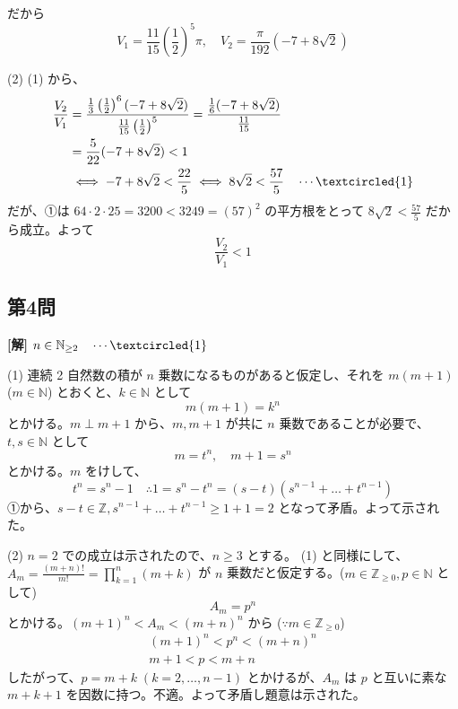 \documentclass[../main.tex]{subfiles}
\begin{document}
だから
\[
  V_1 = \frac{11}{15} \left(\frac{1}{2}\right)^5 \pi, \quad V_2 = \frac{\pi}{192} (-7 + 8\sqrt{2})
\]

\bigskip

\noindent
(2) (1) から、
\begin{align*}
  \frac{V_2}{V_1} &= \frac{\frac{1}{3} \left(\frac{1}{2}\right)^6 (-7 + 8\sqrt{2})}{\frac{11}{15} \left(\frac{1}{2}\right)^5} = \frac{\frac{1}{6}(-7 + 8\sqrt{2})}{\frac{11}{15}} \\
  &= \frac{5}{22} (-7 + 8\sqrt{2}) < 1 \\
  &\iff -7 + 8\sqrt{2} < \frac{22}{5} \iff 8\sqrt{2} < \frac{57}{5} \quad \cdots \textcircled{1}
\end{align*}
だが、①は $64 \cdot 2 \cdot 25 = 3200 < 3249 = (57)^2$ の平方根をとって
$8\sqrt{2} < \frac{57}{5}$ だから成立。よって
\[ \frac{V_2}{V_1} < 1 \]

\bigskip

\subsection*{第4問}

\noindent
\textbf{[解]} $n \in \mathbb{N}_{\ge 2} \quad \cdots \textcircled{1}$

\bigskip

\noindent
(1) 連続 2 自然数の積が $n$ 乗数になるものがあると仮定し、それを $m(m+1)$ ($m \in \mathbb{N}$) とおくと、$k \in \mathbb{N}$ として
\[ m(m+1) = k^n \]
とかける。$m \perp m+1$ から、$m, m+1$ が共に $n$ 乗数であることが必要で、
$t, s \in \mathbb{N}$ として
\[ m = t^n, \quad m+1 = s^n \]
とかける。$m$ をけして、
\[ t^n = s^n - 1 \quad \therefore 1 = s^n - t^n = (s-t)(s^{n-1} + \dots + t^{n-1}) \]
①から、$s-t \in \mathbb{Z}, s^{n-1} + \dots + t^{n-1} \ge 1+1 = 2$ となって矛盾。よって示された。

\bigskip

\noindent
(2) $n=2$ での成立は示されたので、$n \ge 3$ とする。
(1) と同様にして、$A_m = \frac{(m+n)!}{m!} = \prod_{k=1}^n (m+k)$ が $n$ 乗数だと仮定する。($m \in \mathbb{Z}_{\ge 0}, p \in \mathbb{N}$ として)
\[ A_m = p^n \]
とかける。$(m+1)^n < A_m < (m+n)^n$ から ($\because m \in \mathbb{Z}_{\ge 0}$)
\begin{align*}
  (m+1)^n < p^n < (m+n)^n \\
  m+1 < p < m+n
\end{align*}
したがって、$p = m+k \; (k=2, \dots, n-1)$ とかけるが、$A_m$ は $p$ と互いに素な $m+k+1$ を因数に持つ。不適。よって矛盾し題意は示された。
\end{document}
